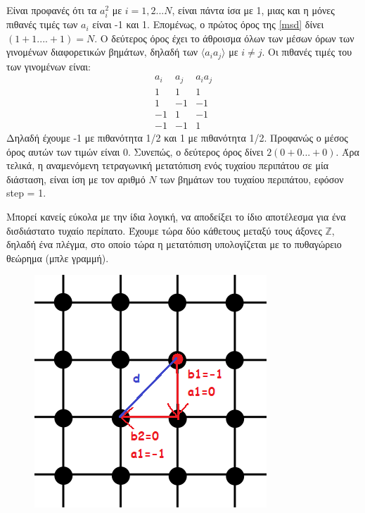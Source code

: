 Είναι προφανές ότι τα $a_i^2$ με $i=1,2...N$, είναι πάντα ίσα με 1, μιας και η μόνες πιθανές τιμές των $a_i$ είναι -1 και 1. Επομένως, ο πρώτος όρος της \eqref{msd} δίνει $(1+1....+1) = Ν$. Ο δεύτερος όρος έχει το άθροισμα όλων των μέσων όρων των γινομένων διαφορετικών βημάτων, δηλαδή των $\langle a_i a_j \rangle$ με $i\neq j$.
Οι πιθανές τιμές του των γινομένων είναι:
\begin{equation}
\begin{array}{rcc}
a_{i} & a_{j} & a_{i} a_{j} \\
1 & 1 & 1 \\
1 & -1 & -1 \\
-1 & 1 & -1 \\
-1 & -1 & 1
\end{array}
\end{equation}
Δηλαδή έχουμε -1 με πιθανότητα 1/2 και 1 με πιθανότητα 1/2. Προφανώς ο μέσος όρος αυτών των τιμών είναι 0. Συνεπώς, ο δεύτερος όρος δίνει $2(0+0...+0)$. Άρα τελικά, η αναμενόμενη τετραγωνική μετατόπιση ενός τυχαίου περιπάτου σε μία διάσταση, είναι ίση με τον αριθμό $Ν$ των βημάτων του τυχαίου περιπάτου, εφόσον {\en step = 1}.

Μπορεί κανείς εύκολα με την ίδια λογική, να αποδείξει το ίδιο αποτέλεσμα για ένα δισδιάστατο τυχαίο περίπατο. Έχουμε τώρα δύο κάθετους μεταξύ τους άξονες $\mathbb{Z}$, δηλαδή ένα πλέγμα, στο οποίο τώρα η μετατόπιση υπολογίζεται με το πυθαγώρειο θεώρημα (μπλε γραμμή).

\begin{figure}[H]
\begin{center}
\includegraphics[scale=1.1]{figures/TheoryRW3.png}
\end{center}
\end{figure}


